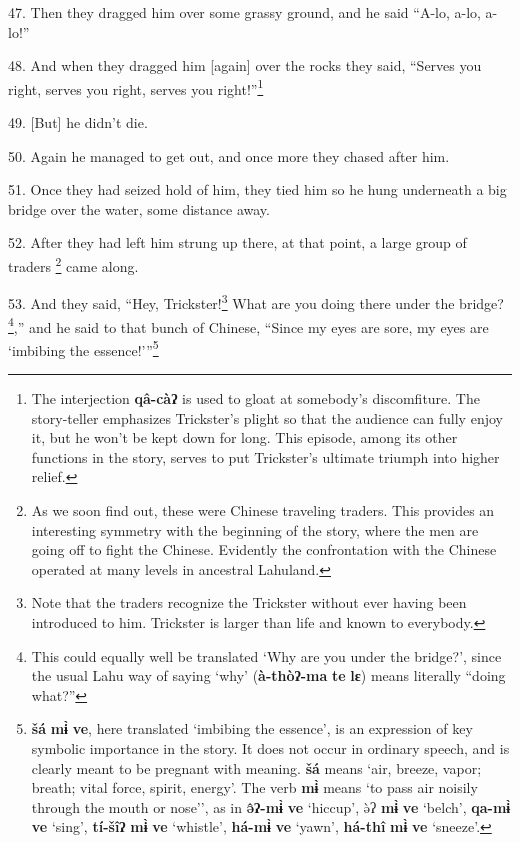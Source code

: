 47. Then they dragged him over some grassy ground, and he said ``A-lo, a-lo, a-lo!''

48. And when they dragged him [again] over the rocks they said, ``Serves you right,
serves you right, serves you right!''\footnote{The interjection \textbf{qâ-càʔ} is used to gloat at somebody's discomfiture. The story-teller emphasizes Trickster's plight so that the audience can fully enjoy it, but he won't be kept down for long. This episode, among its other functions in the story, serves to put Trickster's ultimate triumph into higher relief.}

49. [But] he didn't die.

50. Again he managed to get out, and once more they chased after him.

51. Once they had seized hold of him, they tied him so he hung underneath a big
bridge over the water, some distance away.

52. After they had left him strung up there, at that point, a large group of traders
\footnote{As we soon find out, these were Chinese traveling traders. This provides an interesting symmetry with the beginning of the story, where the men are going off to fight the Chinese. Evidently the confrontation with the Chinese operated at many levels in ancestral Lahuland.} came along.

53. And they said, ``Hey, Trickster!\footnote{Note that the traders recognize the Trickster without ever having been introduced to him. Trickster is larger than life and known to everybody.} What are you doing there under the bridge?
\footnote{This could equally well be translated `Why are you under the bridge?', since the usual Lahu way of saying `why' (\textbf{à-thòʔ-ma} \textbf{te} \textbf{lɛ}) means literally ``doing what?''},'' and he said to that bunch of Chinese, ``Since my eyes are sore, my eyes
are `imbibing the essence!'''\footnote{\textbf{šá} \textbf{mɨ̀} \textbf{ve}, here translated `imbibing the essence', is an expression of key symbolic importance in the story. It does not occur in ordinary speech, and is clearly meant to be pregnant with meaning. \textbf{šá} means `air, breeze, vapor; breath; vital force, spirit, energy'. The verb \textbf{mɨ̀} means `to pass air noisily through the mouth or nose'', as in \textbf{ə̂ʔ-mɨ̀} \textbf{ve} `hiccup', ə̀ʔ \textbf{mɨ̀} \textbf{ve} `belch', \textbf{qa-mɨ̀} \textbf{ve} `sing', \textbf{tí-šîʔ} \textbf{mɨ̀} \textbf{ve} `whistle', \textbf{há-mɨ̀} \textbf{ve} `yawn', \textbf{há-thî} \textbf{mɨ̀} \textbf{ve} `sneeze'.}

